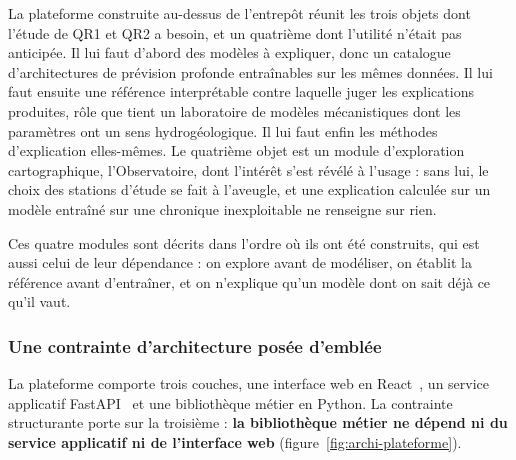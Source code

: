 La plateforme construite au-dessus de l'entrepôt réunit les trois objets dont l'étude de QR1 et
QR2 a besoin, et un quatrième dont l'utilité n'était pas anticipée. Il lui faut d'abord des
modèles à expliquer, donc un catalogue d'architectures de prévision profonde entraînables sur les
mêmes données. Il lui faut ensuite une référence interprétable contre laquelle juger les
explications produites, rôle que tient un laboratoire de modèles mécanistiques dont les paramètres
ont un sens hydrogéologique. Il lui faut enfin les méthodes d'explication elles-mêmes. Le
quatrième objet est un module d'exploration cartographique, l'Observatoire, dont l'intérêt s'est
révélé à l'usage : sans lui, le choix des stations d'étude se fait à l'aveugle, et une explication
calculée sur un modèle entraîné sur une chronique inexploitable ne renseigne sur rien.

Ces quatre modules sont décrits dans l'ordre où ils ont été construits, qui est aussi celui de
leur dépendance : on explore avant de modéliser, on établit la référence avant d'entraîner, et on
n'explique qu'un modèle dont on sait déjà ce qu'il vaut.

\subsubsection{Une contrainte d'architecture posée d'emblée}

La plateforme comporte trois couches, une interface web en React~\cite{react}, un service applicatif FastAPI~\cite{fastapi} et une bibliothèque métier en Python. La contrainte structurante porte sur la troisième : \textbf{la bibliothèque métier ne dépend ni du service applicatif ni de l'interface web} (figure~\ref{fig:archi-plateforme}).

